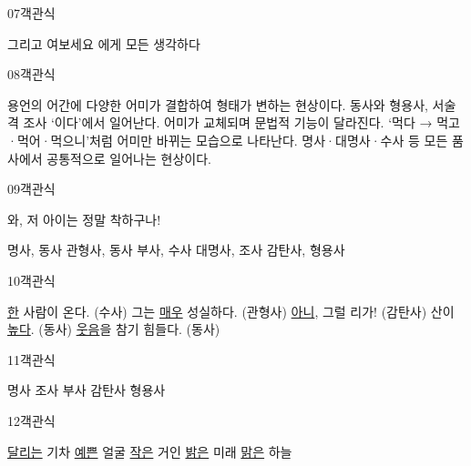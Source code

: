 \documentclass[fs9,seriesRus]{korfarm-base}
\begin{document}
\begin{kfQBlock}{07}{객관식}
\begin{kfChoices}
\kfChoice 그리고
\kfChoice 여보세요
\kfChoice 에게
\kfChoice 모든
\kfChoice 생각하다
\end{kfChoices}
\end{kfQBlock}
\begin{kfQBlock}{08}{객관식}
\begin{kfChoices}
\kfChoice 용언의 어간에 다양한 어미가 결합하여 형태가 변하는 현상이다.
\kfChoice 동사와 형용사, 서술격 조사 ‘이다’에서 일어난다.
\kfChoice 어미가 교체되며 문법적 기능이 달라진다.
\kfChoice ‘먹다 → 먹고·먹어·먹으니’처럼 어미만 바뀌는 모습으로 나타난다.
\kfChoice 명사·대명사·수사 등 모든 품사에서 공통적으로 일어나는 현상이다.
\end{kfChoices}
\end{kfQBlock}
\begin{kfQBlock}{09}{객관식}
\begin{kfEvidence}와, 저 아이는 정말 착하구나!\end{kfEvidence}
\begin{kfChoices}
\kfChoice 명사, 동사
\kfChoice 관형사, 동사
\kfChoice 부사, 수사
\kfChoice 대명사, 조사
\kfChoice 감탄사, 형용사
\end{kfChoices}
\end{kfQBlock}
\begin{kfQBlock}{10}{객관식}
\begin{kfChoices}
\kfChoice \uline{한} 사람이 온다. (수사)
\kfChoice 그는 \uline{매우} 성실하다. (관형사)
\kfChoice \uline{아니}, 그럴 리가! (감탄사)
\kfChoice 산이 \uline{높다}. (동사)
\kfChoice \uline{웃음}을 참기 힘들다. (동사)
\end{kfChoices}
\end{kfQBlock}
\begin{kfQBlock}{11}{객관식}
\begin{kfChoices}
\kfChoice 명사
\kfChoice 조사
\kfChoice 부사
\kfChoice 감탄사
\kfChoice 형용사
\end{kfChoices}
\end{kfQBlock}
\begin{kfQBlock}{12}{객관식}
\begin{kfChoices}
\kfChoice \uline{달리는} 기차
\kfChoice \uline{예쁜} 얼굴
\kfChoice \uline{작은} 거인
\kfChoice \uline{밝은} 미래
\kfChoice \uline{맑은} 하늘
\end{kfChoices}
\end{kfQBlock}
\end{document}

